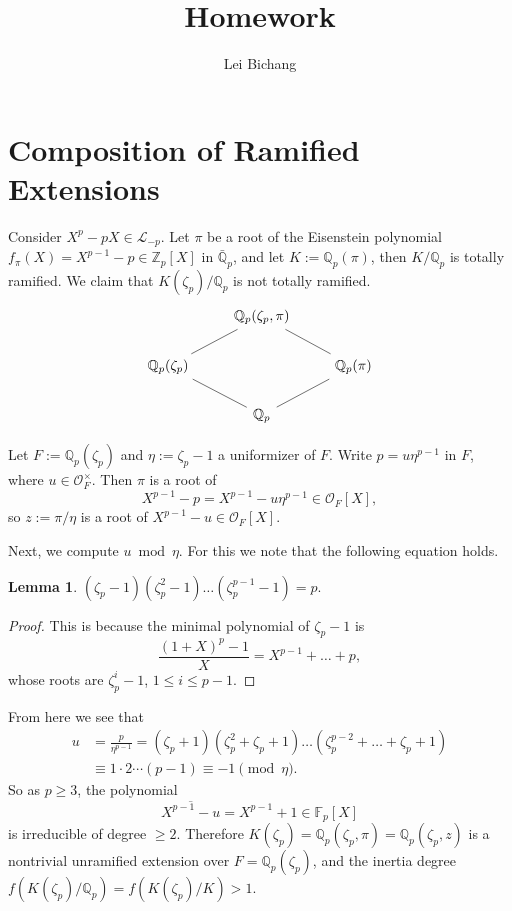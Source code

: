\documentclass{article}
\title{Homework}
\author{Lei Bichang}
\date{}
\theoremstyle{definition}
\newtheorem{lemma}{Lemma}
\theoremstyle{remark}
\newcommand{\Q}{\mathbb{Q}}
\newcommand{\Z}{\mathbb{Z}}
\renewcommand{\O}{\mathcal{O}}
\newcommand{\F}{\mathbb{F}}
\begin{document}
\maketitle

\section{Composition of Ramified Extensions}
Consider $X^p - pX\in \mathcal{L}_{-p}$.
Let $\pi$ be a root of the Eisenstein polynomial $f_\pi(X) = X^{p-1} - p\in\Z_p[X]$ in $\bar{\Q}_p$,
and let $K := \Q_p(\pi)$, then $K/\Q_p$ is totally ramified. We claim that $K(\zeta_p)/\Q_p$ is not totally ramified.
\[\begin{tikzcd}
	& {\Q_p(\zeta_p, \pi)} \\
	{\Q_p(\zeta_p)} && {\Q_p(\pi)} \\
	& {\Q_p}
	\arrow[no head, from=1-2, to=2-3]
	\arrow[no head, from=2-1, to=1-2]
	\arrow[no head, from=2-1, to=3-2]
	\arrow[no head, from=3-2, to=2-3]
\end{tikzcd}\]


Let $F := \Q_p(\zeta_p)$ and $\eta := \zeta_p - 1$ a uniformizer of $F$.
Write $p = u\eta^{p-1}$ in $F$,
where $u\in \O_{F}^\times$.
Then $\pi$ is a root of \[X^{p-1} - p = X^{p-1} - u\eta^{p-1}\in \O_{F}[X],\]
so $z := \pi/\eta$ is a root of $X^{p-1} - u\in\O_F[X]$.

Next, we compute $u\bmod \eta$.
For this we note that the following equation holds.
\begin{lemma}
    $(\zeta_p - 1)(\zeta_p^2 - 1)\dots(\zeta_p^{p-1} - 1) = p$.
\end{lemma}
\begin{proof}
    This is because the minimal polynomial of $\zeta_p - 1$ is
    \[\frac{(1 + X)^p - 1}{X} = X^{p-1} + \dots  + p,\]
    whose roots are $\zeta_p^{i} - 1$, $1\le i\le p - 1$.
\end{proof}
From here we see that\begin{align*}
    u &= \frac p{\eta^{p-1}} = (\zeta_p + 1)(\zeta_p^2 + \zeta_p + 1)\dots (\zeta_p^{p-2} + \dots + \zeta_p + 1)\\
    &\equiv 1\cdot2\cdots (p-1) \equiv -1\pmod \eta.
\end{align*}
So as $p\ge 3$, the polynomial \[\overline{X^{p-1} - u} = X^{p-1} + 1\in\F_p[X]\] is irreducible of degree $\ge 2$.
Therefore $K(\zeta_p) = \Q_p(\zeta_p, \pi) = \Q_p(\zeta_p, z)$ is a nontrivial unramified extension over $F = \Q_p(\zeta_p)$,
and the inertia degree $f(K(\zeta_p)/\Q_p) = f(K(\zeta_p)/K) > 1$.
\end{document}
